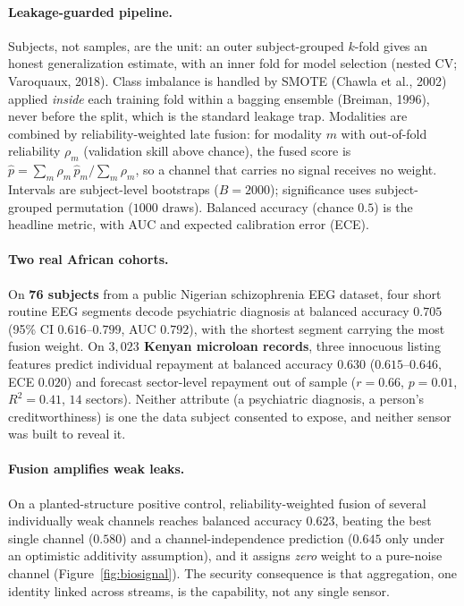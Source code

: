 \documentclass{article}
\begin{document}
\paragraph{Leakage-guarded pipeline.} Subjects, not samples, are the unit: an outer subject-grouped $k$-fold gives
an honest generalization estimate, with an inner fold for model selection (nested CV; Varoquaux, 2018). Class
imbalance is handled by SMOTE (Chawla et al., 2002) applied \emph{inside} each training fold within a bagging
ensemble (Breiman, 1996), never before the split, which is the standard leakage trap. Modalities are combined by
reliability-weighted late fusion: for modality $m$ with out-of-fold reliability $\rho_m$ (validation skill above
chance), the fused score is $\hat{p} = \sum_m \rho_m\, \hat{p}_m / \sum_m \rho_m$, so a channel that carries no
signal receives no weight. Intervals are subject-level bootstraps ($B=2000$); significance uses subject-grouped
permutation ($1000$ draws). Balanced accuracy (chance $0.5$) is the headline metric, with AUC and expected
calibration error (ECE).

\paragraph{Two real African cohorts.} On \textbf{76 subjects} from a public Nigerian schizophrenia EEG dataset,
four short routine EEG segments decode psychiatric diagnosis at balanced accuracy $\mathbf{0.705}$ (95\% CI
$0.616$--$0.799$, AUC $0.792$), with the shortest segment carrying the most fusion weight. On \textbf{$3{,}023$
Kenyan microloan records}, three innocuous listing features predict individual repayment at balanced accuracy
$\mathbf{0.630}$ ($0.615$--$0.646$, ECE $0.020$) and forecast sector-level repayment out of sample ($r=0.66$,
$p=0.01$, $R^2=0.41$, $14$ sectors). Neither attribute (a psychiatric diagnosis, a person's creditworthiness) is
one the data subject consented to expose, and neither sensor was built to reveal it.

\paragraph{Fusion amplifies weak leaks.} On a planted-structure positive control, reliability-weighted fusion of
several individually weak channels reaches balanced accuracy $0.623$, beating the best single channel ($0.580$)
and a channel-independence prediction ($0.645$ only under an optimistic additivity assumption), and it assigns
\emph{zero} weight to a pure-noise channel (Figure~\ref{fig:biosignal}). The security consequence is that
aggregation, one identity linked across streams, is the capability, not any single sensor.
\end{document}
